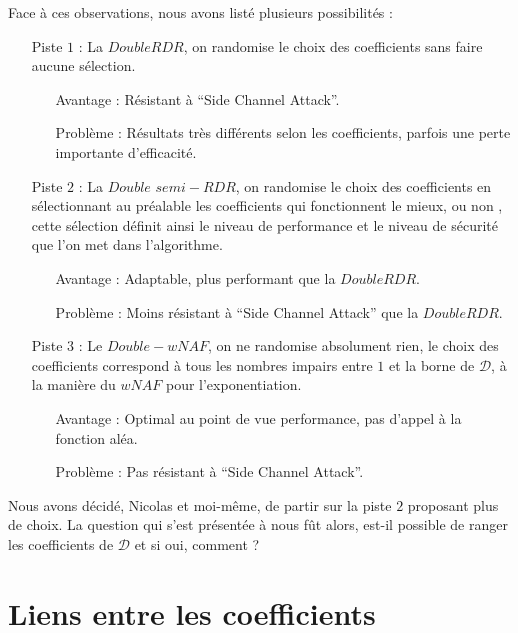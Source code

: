 \documentclass[12pt, a4paper]{memoir}
\begin{document}
  Face à ces observations, nous avons listé plusieurs possibilités :
  \begin{itemize}
   \item [Piste $1$ :] La $DoubleRDR$, on randomise le choix des coefficients sans faire aucune sélection.
   \begin{itemize}
    \item [Avantage :] Résistant à ``Side Channel Attack''.
    \item [Problème :] Résultats très différents selon les coefficients, parfois une perte importante d'efficacité.
   \end{itemize}

   \item [Piste $2$ :] La $Double$ $semi-RDR$, on randomise le choix des coefficients en sélectionnant au préalable
   les coefficients qui fonctionnent le mieux, ou non , cette sélection définit ainsi le niveau de performance et
   le niveau de sécurité que l'on met dans l'algorithme.
   \begin{itemize}
    \item [Avantage :] Adaptable, plus performant que la $DoubleRDR$.
    \item [Problème :] Moins résistant à ``Side Channel Attack'' que la $DoubleRDR$.
   \end{itemize}
   
   \item [Piste $3$ :] Le $Double-wNAF$, on ne randomise absolument rien, le choix des coefficients correspond
   à tous les nombres impairs entre $1$ et la borne de $\mathcal{D}$, à la manière du $wNAF$ pour l'exponentiation.
   \begin{itemize}
    \item [Avantage :] Optimal au point de vue performance, pas d'appel à la fonction aléa.
    \item [Problème :] Pas résistant à ``Side Channel Attack''.
   \end{itemize}
  \end{itemize}
  
  Nous avons décidé, Nicolas et moi-même, de partir sur la piste $2$ proposant plus de choix.
  La question qui s'est présentée à nous fût alors, est-il possible de 
  ranger les coefficients de $\mathcal{D}$ et si oui, comment ?
  
  \section{Liens entre les coefficients}
  
\end{document}
